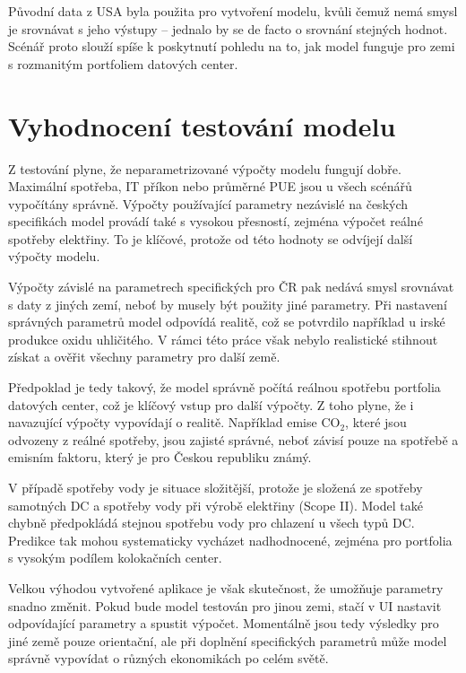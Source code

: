 Původní data z USA byla použita pro vytvoření modelu, kvůli čemuž nemá smysl je srovnávat s jeho výstupy -- jednalo by se de facto o srovnání stejných hodnot. Scénář proto slouží spíše k poskytnutí pohledu na to, jak model funguje pro zemi s rozmanitým portfoliem datových center.

\section{Vyhodnocení testování modelu}
\label{sec:testovani_vyhodnoceni}

Z testování plyne, že neparametrizované výpočty modelu fungují dobře. Maximální spotřeba, IT příkon nebo průměrné PUE jsou u všech scénářů vypočítány správně. Výpočty používající parametry nezávislé na českých specifikách model provádí také s vysokou přesností, zejména výpočet reálné spotřeby elektřiny. To je klíčové, protože od této hodnoty se odvíjejí další výpočty modelu.

Výpočty závislé na parametrech specifických pro ČR pak nedává smysl srovnávat s daty z jiných zemí, neboť by musely být použity jiné parametry. Při nastavení správných parametrů model odpovídá realitě, což se potvrdilo například u irské produkce oxidu uhličitého. V rámci této práce však nebylo realistické stihnout získat a ověřit všechny parametry pro další země.

Předpoklad je tedy takový, že model správně počítá reálnou spotřebu portfolia datových center, což je klíčový vstup pro další výpočty. Z toho plyne, že i navazující výpočty vypovídají o realitě. Například emise CO$_2$, které jsou odvozeny z reálné spotřeby, jsou zajisté správné, neboť závisí pouze na spotřebě a emisním faktoru, který je pro Českou republiku známý.

V případě spotřeby vody je situace složitější, protože je složená ze spotřeby samotných DC a spotřeby vody při výrobě elektřiny (Scope II). Model také chybně předpokládá stejnou spotřebu vody pro chlazení u všech typů DC. Predikce tak mohou systematicky vycházet nadhodnocené, zejména pro portfolia s vysokým podílem kolokačních center.

Velkou výhodou vytvořené aplikace je však skutečnost, že umožňuje parametry snadno změnit. Pokud bude model testován pro jinou zemi, stačí v UI nastavit odpovídající parametry a spustit výpočet. Momentálně jsou tedy výsledky pro jiné země pouze orientační, ale při doplnění specifických parametrů může model správně vypovídat o různých ekonomikách po celém světě.